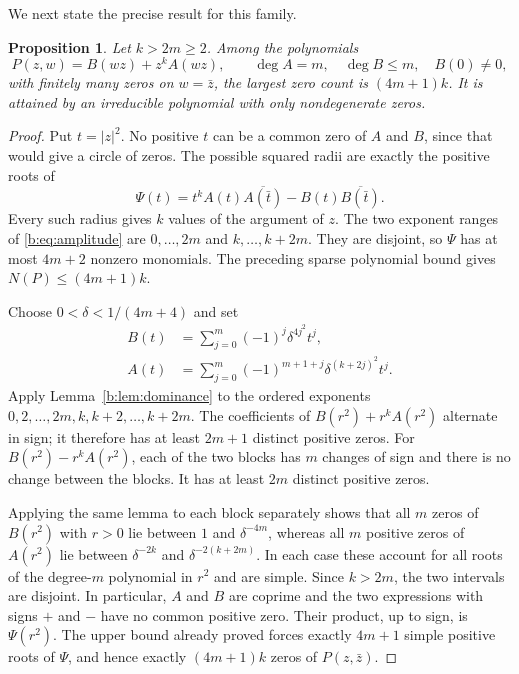 \documentclass[UTF8,11pt]{ctexart}
\newtheorem{prop}[thm]{Proposition}
\theoremstyle{definition}
\numberwithin{equation}{section}
\begin{document}
We next state the precise result for this family.
\begin{prop}\label{b:prop:radial}
Let $k>2m\ge2$. Among the polynomials
\[
 P(z,w)=B(wz)+z^kA(wz),\qquad
 \deg A=m,\quad\deg B\le m,\quad B(0)\ne0,
\]
with finitely many zeros on $w=\bar z$, the largest zero count is
$(4m+1)k$. It is attained by an irreducible polynomial with only
nondegenerate zeros.
\end{prop}
\begin{proof}
Put $t=|z|^2$. No positive $t$ can be a common zero of $A$ and $B$,
since that would give a circle of zeros. The possible squared radii
are exactly the positive roots of
\begin{equation}\label{b:eq:amplitude}
 \Psi(t)=t^kA(t)\overline{A(\bar t)}-B(t)\overline{B(\bar t)}.
\end{equation}
Every such radius gives $k$ values of the argument of $z$.
The two exponent ranges of \eqref{b:eq:amplitude} are
$0,\ldots,2m$ and $k,\ldots,k+2m$. They are disjoint, so
$\Psi$ has at most $4m+2$ nonzero monomials. The preceding sparse
polynomial bound gives $N(P)\le(4m+1)k$.

Choose $0<\delta<1/(4m+4)$ and set
\begin{equation}\label{b:eq:radialcoefficients}
 \begin{split}
 B(t)&=\sum_{j=0}^m(-1)^j\delta^{4j^2}t^j,\\
 A(t)&=\sum_{j=0}^m(-1)^{m+1+j}
                   \delta^{(k+2j)^2}t^j.
 \end{split}
\end{equation}
Apply Lemma~\ref{b:lem:dominance} to the ordered exponents
$0,2,\ldots,2m,k,k+2,\ldots,k+2m$.
The coefficients of $B(r^2)+r^kA(r^2)$ alternate in sign; it therefore
has at least $2m+1$ distinct positive zeros. For
$B(r^2)-r^kA(r^2)$, each of the two blocks has $m$ changes of sign
and there is no change between the blocks. It has at least $2m$
distinct positive zeros.

Applying the same lemma to each block separately shows that all $m$
zeros of $B(r^2)$ with $r>0$ lie between $1$ and $\delta^{-4m}$,
whereas all $m$ positive zeros of $A(r^2)$ lie between
$\delta^{-2k}$ and $\delta^{-2(k+2m)}$. In each case these account
for all roots of the degree-$m$ polynomial in $r^2$ and are simple.
Since $k>2m$, the two intervals are disjoint. In particular, $A$ and
$B$ are coprime and the two expressions with signs $+$ and $-$ have
no common positive zero. Their product, up to sign, is
$\Psi(r^2)$. The upper bound already proved forces exactly $4m+1$
simple positive roots of $\Psi$, and hence exactly $(4m+1)k$ zeros
of $P(z,\bar z)$.


\end{proof}
\end{document}
